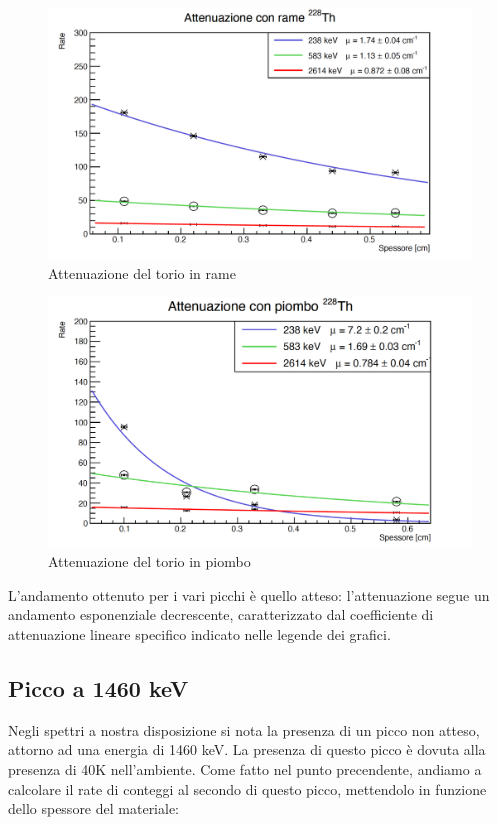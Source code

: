 \documentclass[a4paper,10pt]{article}
\begin{document}
\begin{figure}[H]
    \centering
    \includegraphics[scale=0.45]{grafici/attenuazionetoriorame}
    \caption{Attenuazione del torio in rame}
\end{figure}

\begin{figure}[H]
    \centering
    \includegraphics[scale=0.45]{grafici/attenuazionetoriopiombo}
    \caption{Attenuazione del torio in piombo}
\end{figure}

\noindent L'andamento ottenuto per i vari picchi \`e quello atteso: l'attenuazione segue un andamento esponenziale decrescente, caratterizzato dal coefficiente di attenuazione lineare specifico indicato nelle legende dei grafici.

\subsection{Picco a 1460 keV}

\noindent Negli spettri a nostra disposizione si nota la presenza di un picco non atteso, attorno ad una energia di 1460 keV. La presenza di questo picco \`e dovuta alla presenza di 40K nell'ambiente. Come fatto nel punto precendente, andiamo a calcolare il rate di conteggi al secondo di questo picco, mettendolo in funzione dello spessore del materiale:
\end{document}
